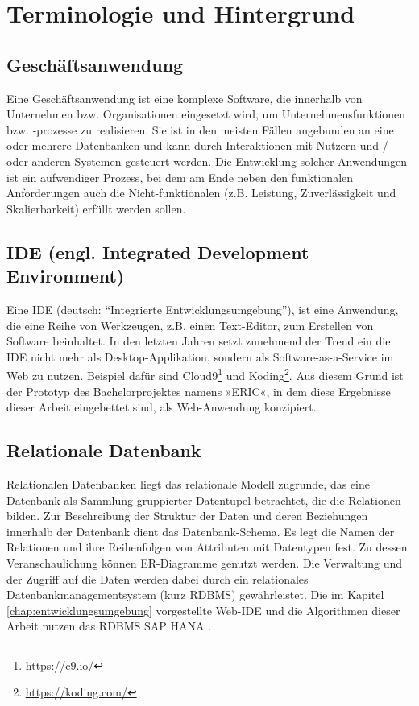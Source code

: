 \section{Terminologie und Hintergrund}\label{chap:terminology}


\subsection{Geschäftsanwendung}
Eine Geschäftsanwendung ist eine komplexe Software, die innerhalb von Unternehmen bzw. Organisationen eingesetzt wird, um Unternehmensfunktionen bzw. -prozesse zu realisieren.
Sie ist in den meisten Fällen angebunden an eine oder mehrere Datenbanken und kann durch Interaktionen mit Nutzern und / oder anderen Systemen gesteuert werden.
Die Entwicklung solcher Anwendungen ist ein aufwendiger Prozess, bei dem am Ende neben den funktionalen Anforderungen auch die Nicht-funktionalen (z.B. Leistung, Zuverlässigkeit und Skalierbarkeit) erfüllt werden sollen.

\subsection{IDE (engl. Integrated Development Environment)}
Eine IDE (deutsch: ``Integrierte Entwicklungsumgebung''), ist eine Anwendung, die eine Reihe von Werkzeugen, z.B. einen Text-Editor, zum Erstellen von Software beinhaltet.
In den letzten Jahren setzt zunehmend der Trend ein die IDE nicht mehr als Desktop-Applikation, sondern als Software-as-a-Service \cite{SIIA} im Web zu nutzen.
Beispiel dafür sind Cloud9\footnote{\url{https://c9.io/}} und Koding\footnote{\url{https://koding.com/}}.
Aus diesem Grund ist der Prototyp des Bachelorprojektes namens »ERIC«, in dem diese Ergebnisse dieser Arbeit eingebettet sind, als Web-Anwendung konzipiert.

\subsection{Relationale Datenbank}
Relationalen Datenbanken liegt das relationale Modell \cite{Codd:1970:RMD:362384.362685} zugrunde, das eine Datenbank als Sammlung gruppierter Datentupel betrachtet, die die Relationen bilden.
Zur Beschreibung der Struktur der Daten und deren Beziehungen innerhalb der Datenbank dient das Datenbank-Schema.
Es legt die Namen der Relationen und ihre Reihenfolgen von Attributen mit Datentypen fest.
Zu dessen Veranschaulichung können ER-Diagramme \cite{Chen:1976:EMU:320434.320440} genutzt werden.
Die Verwaltung und der Zugriff auf die Daten werden dabei durch ein relationales Datenbankmanagementsystem (kurz RDBMS) gewährleistet.
Die im Kapitel \ref{chap:entwicklungsumgebung} vorgestellte Web-IDE und die Algorithmen dieser Arbeit nutzen das RDBMS SAP HANA \cite{DBLP:dblp_journals/sigmod/FarberCPBSL11}.

